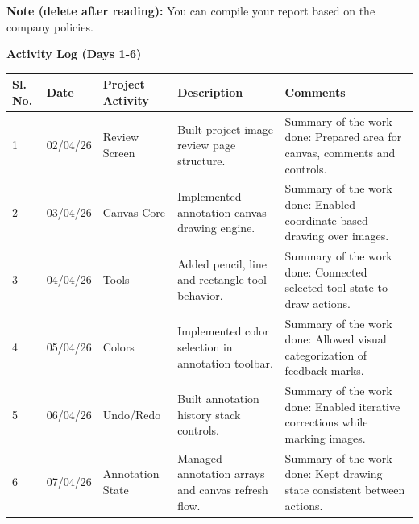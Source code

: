 \documentclass[12pt,a4paper]{article}
\begin{document}
{\color{red}\small\textbf{Note (delete after reading):} You can compile your report based on the company policies.}
\vspace{0.25cm}
\begin{center}{\large\bfseries Activity Log (Days 1-6)}\end{center}
\begin{tabular}{|p{}|p{}|p{}|p{}|p{}|}\hline
\centering\textbf{Sl. No.} & \centering\textbf{Date} & \centering\textbf{Project Activity} & \centering\textbf{Description} & \centering\textbf{Comments} \tabularnewline\hline
1 & 02/04/26 & Review Screen & Built project image review page structure. &
Summary of the work done:\newline
Prepared area for canvas, comments and controls. \\ \hline
2 & 03/04/26 & Canvas Core & Implemented annotation canvas drawing engine. &
Summary of the work done:\newline
Enabled coordinate-based drawing over images. \\ \hline
3 & 04/04/26 & Tools & Added pencil, line and rectangle tool behavior. &
Summary of the work done:\newline
Connected selected tool state to draw actions. \\ \hline
4 & 05/04/26 & Colors & Implemented color selection in annotation toolbar. &
Summary of the work done:\newline
Allowed visual categorization of feedback marks. \\ \hline
5 & 06/04/26 & Undo/Redo & Built annotation history stack controls. &
Summary of the work done:\newline
Enabled iterative corrections while marking images. \\ \hline
6 & 07/04/26 & Annotation State & Managed annotation arrays and canvas refresh flow. &
Summary of the work done:\newline
Kept drawing state consistent between actions. \\ \hline
\end{tabular}

\newpage
\end{document}
